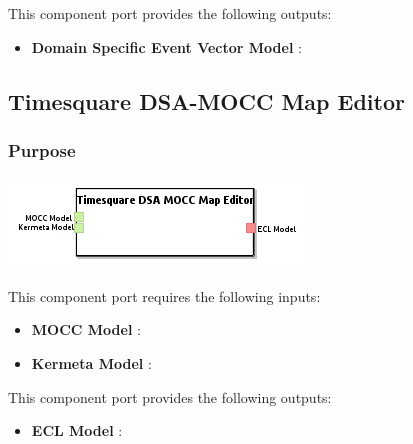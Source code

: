 \documentclass{gemoc} %
\begin{document}
This component port provides the following outputs:
\begin{itemize}
  \item \textbf{Domain Specific Event Vector Model} :
\end{itemize}


\subsection{Timesquare DSA-MOCC Map Editor}


\subsubsection{Purpose}


\begin{center}
\includegraphics*[trim=0.0cm 0.0cm 0cm 0.0cm, clip=true]{../images/generated/Generated_Timesquare_DSA-MOCC_Map_Editor.png}
\end{center}

This component port requires the following inputs:
\begin{itemize}
  \item \textbf{MOCC Model} :
  \item \textbf{Kermeta Model} :
\end{itemize}

This component port provides the following outputs:
\begin{itemize}
  \item \textbf{ECL Model} :
\end{itemize}
\end{document}

